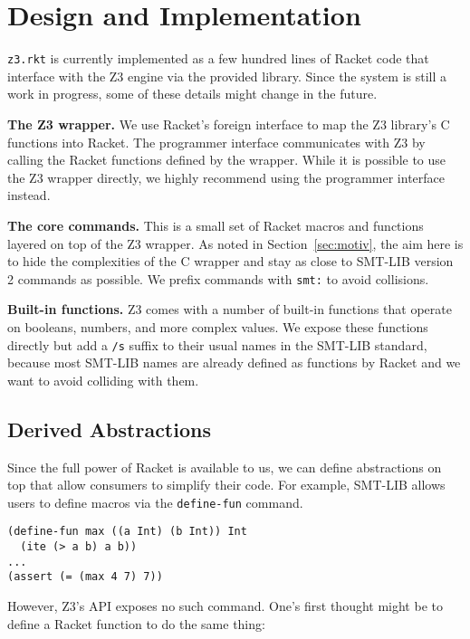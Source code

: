 \section{Design and Implementation}
\label{sec:design-impl}

\texttt{z3.rkt} is currently implemented as a few hundred lines of Racket code
that interface with the Z3 engine via the provided library. Since the system is
still a work in progress, some of these details might change in the future.

\textbf{The Z3 wrapper.} We use Racket's foreign interface \cite{racket/foreign}
to map the Z3 library's C functions into Racket. The programmer interface
communicates with Z3 by calling the Racket functions defined by the
wrapper. While it is possible to use the Z3 wrapper directly, we highly
recommend using the programmer interface instead.

\textbf{The core commands.} This is a small set of Racket macros and functions
layered on top of the Z3 wrapper. As noted in Section~\ref{sec:motiv}, the aim
here is to hide the complexities of the C wrapper and stay as close to SMT-LIB
version 2 commands \cite{smtlib2:10} as possible. We prefix commands with
\texttt{smt:} to avoid collisions.

\textbf{Built-in functions.} Z3 comes with a number of built-in functions that
operate on booleans, numbers, and more complex values. We expose these
functions directly but add a \texttt{/s} suffix to their usual names in the
SMT-LIB standard, because most SMT-LIB names are already defined as functions
by Racket and we want to avoid colliding with them.

\subsection{Derived Abstractions}

Since the full power of Racket is available to us, we can define abstractions
on top that allow consumers to simplify their code. For example, SMT-LIB
allows users to define macros via the \texttt {define-fun} command.

\begin{verbatim}
(define-fun max ((a Int) (b Int)) Int
  (ite (> a b) a b))
...
(assert (= (max 4 7) 7))
\end{verbatim}

However, Z3's API exposes no such command. One's first thought might be to
define a Racket function to do the same thing:

